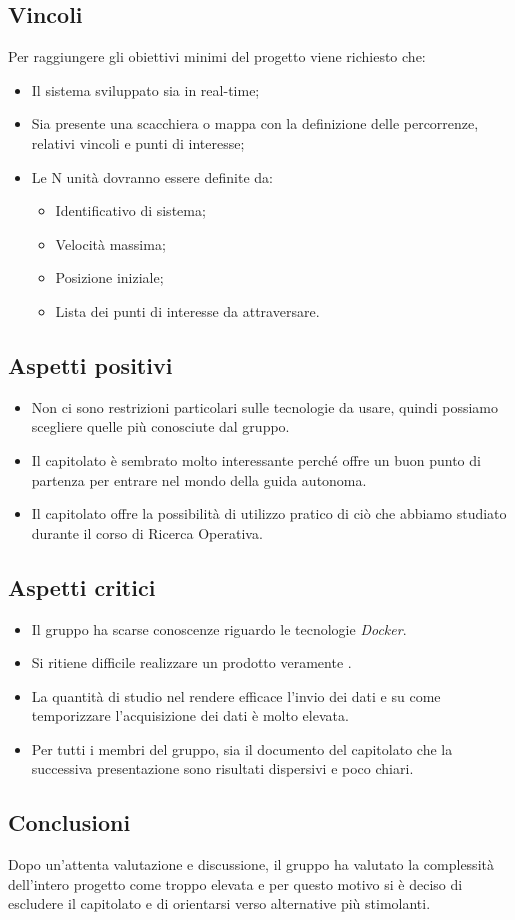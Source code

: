 \subsection{Vincoli}
Per raggiungere gli obiettivi minimi del progetto viene richiesto che:
\begin{itemize}
\item Il sistema sviluppato sia in real-time;
\item Sia presente una scacchiera o mappa con la definizione delle percorrenze, relativi vincoli e punti di interesse;
\item Le N unità dovranno essere definite da:
	\begin{itemize}
	\item Identificativo di sistema;
	\item Velocità massima;
	\item Posizione iniziale;
	\item Lista dei punti di interesse da attraversare.
	\end{itemize}
\end{itemize}

\subsection{Aspetti positivi}
\begin{itemize}
	\item Non ci sono restrizioni particolari sulle tecnologie da usare, quindi possiamo scegliere quelle più conosciute dal gruppo.
	\item Il capitolato è sembrato molto interessante perché offre un buon punto di partenza per entrare nel mondo della guida autonoma.
	\item Il capitolato offre la possibilità di utilizzo pratico di ciò che abbiamo studiato durante il corso di Ricerca Operativa.
\end{itemize}

\subsection{Aspetti critici}
\begin{itemize}
	\item Il gruppo ha scarse conoscenze riguardo le tecnologie \textit{Docker}.
	\item Si ritiene difficile realizzare un prodotto veramente .
	\item La quantità di studio nel rendere efficace l'invio dei dati e su come temporizzare l'acquisizione dei dati è molto elevata.
	\item Per tutti i membri del gruppo, sia il documento del capitolato che la successiva presentazione sono risultati dispersivi e poco chiari. 
\end{itemize}

\subsection{Conclusioni}
Dopo un'attenta valutazione e discussione, il gruppo ha valutato la complessità dell'intero progetto come troppo elevata e per questo motivo si è deciso di escludere il capitolato e di orientarsi verso alternative più stimolanti.
